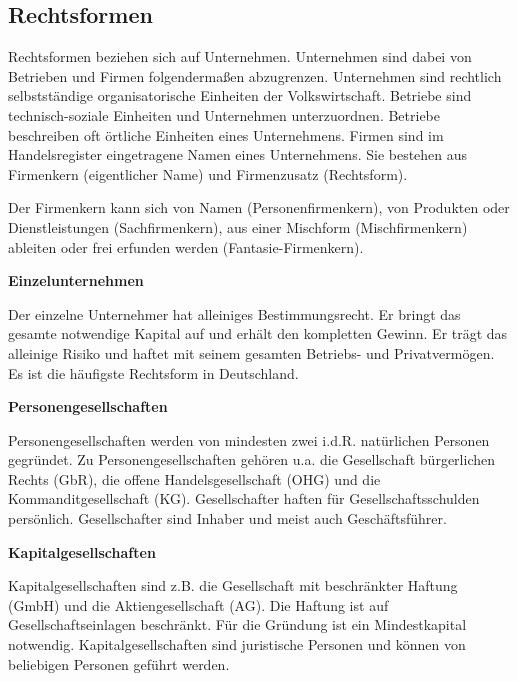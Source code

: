 \subsection{Rechtsformen}

Rechtsformen beziehen sich auf Unternehmen. Unternehmen sind dabei von Betrieben und Firmen folgendermaßen abzugrenzen. Unternehmen sind rechtlich selbstständige organisatorische Einheiten der Volkswirtschaft. Betriebe sind technisch-soziale Einheiten und Unternehmen unterzuordnen. Betriebe beschreiben oft örtliche Einheiten eines Unternehmens. Firmen sind im Handelsregister eingetragene Namen eines Unternehmens. Sie bestehen aus Firmenkern (eigentlicher Name) und Firmenzusatz (Rechtsform).

Der Firmenkern kann sich von Namen (Personenfirmenkern), von Produkten oder Dienstleistungen (Sachfirmenkern), aus einer Mischform (Mischfirmenkern) ableiten oder frei erfunden werden (Fantasie-Firmenkern).

\textbf{Einzelunternehmen}

Der einzelne Unternehmer hat alleiniges Bestimmungsrecht. Er bringt das gesamte notwendige Kapital auf und erhält den kompletten Gewinn. Er trägt das alleinige Risiko und haftet mit seinem gesamten Betriebs- und Privatvermögen. Es ist die häufigste Rechtsform in Deutschland.

\textbf{Personengesellschaften}

Personengesellschaften werden von mindesten zwei i.d.R. natürlichen Personen gegründet. Zu Personengesellschaften gehören u.a. die Gesellschaft bürgerlichen Rechts (GbR), die offene Handelsgesellschaft (OHG) und die Kommanditgesellschaft (KG). Gesellschafter haften für Gesellschaftsschulden persönlich. Gesellschafter sind Inhaber und meist auch Geschäftsführer.

\textbf{Kapitalgesellschaften}

Kapitalgesellschaften sind z.B. die Gesellschaft mit beschränkter Haftung (GmbH) und die Aktiengesellschaft (AG). Die Haftung ist auf Gesellschaftseinlagen beschränkt. Für die Gründung ist ein Mindestkapital notwendig. Kapitalgesellschaften sind juristische Personen und können von beliebigen Personen geführt werden.

